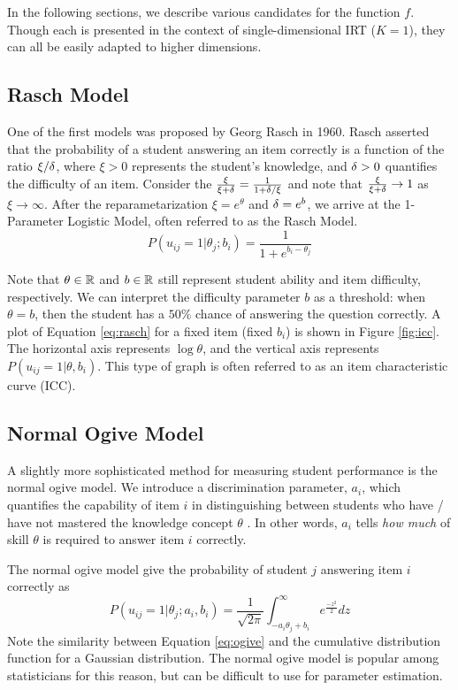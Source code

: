 In the following sections, we describe various candidates for the function $f$. Though each is presented in the context of single-dimensional IRT ($K = 1$), they can all be easily adapted to higher dimensions.

\subsection{Rasch Model}
One of the first models was proposed by Georg Rasch in 1960. Rasch asserted that the probability of a student answering an item correctly is a function of the ratio $\xi / \delta$, where $\xi > 0$ represents the student's knowledge, and $\delta > 0$ quantifies the difficulty of an item. Consider the $\frac{\xi}{\xi + \delta} = \frac{1}{1 + \delta / \xi}$ and note that $\frac{\xi}{\xi + \delta} \to 1$ as $\xi \to \infty$. After the reparametarization $\xi = e^{\theta}$ and $\delta = e^{b}$, we arrive at the 1-Parameter Logistic Model, often referred to as the Rasch Model.
\begin{equation}
  P(u_{ij} = 1 | \theta_j; b_i) = \frac{1}{1 + e^{b_i - \theta_j}}
  \label{eq:rasch}
\end{equation}

Note that $\theta \in \mathbb{R}$ and $b \in \mathbb{R}$ still represent student ability and item difficulty, respectively. We can interpret the difficulty parameter $b$ as a threshold: when $\theta = b$, then the student has a $50\%$ chance of answering the question correctly. A plot of Equation \ref{eq:rasch} for a fixed item (fixed $b_i$) is shown in Figure \ref{fig:icc}. The horizontal axis represents $\log \theta$, and the vertical axis represents $P(u_{ij} = 1 | \theta, b_i)$. This type of graph is often referred to as an item characteristic curve (ICC).

\subsection{Normal Ogive Model}
A slightly more sophisticated method for measuring student performance is the normal ogive model. We introduce a discrimination parameter, $a_i$, which quantifies the capability of item $i$ in distinguishing between students who have / have not mastered the knowledge concept $\theta$ \cite{thissen}. In other words, $a_i$ tells \textit{how much} of skill $\theta$ is required to answer item $i$ correctly. 

The normal ogive model give the probability of student $j$ answering item $i$ correctly as
\begin{equation}
  P(u_{ij} = 1 | \theta_j; a_i, b_i) = \frac{1}{\sqrt{2\pi}} \int_{-a_i \theta_j + b_i}^\infty e^{\frac{-z^{2}}{2}}dz
  \label{eq:ogive}
\end{equation}
Note the similarity between Equation \ref{eq:ogive} and the cumulative distribution function for a Gaussian distribution. The normal ogive model is popular among statisticians for this reason, but can be difficult to use for parameter estimation. 

